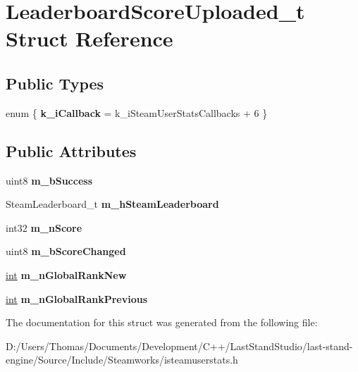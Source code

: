 \hypertarget{structLeaderboardScoreUploaded__t}{}\section{Leaderboard\+Score\+Uploaded\+\_\+t Struct Reference}
\label{structLeaderboardScoreUploaded__t}
\subsection*{Public Types}
\begin{DoxyCompactItemize}
\item 
\hypertarget{structLeaderboardScoreUploaded__t_ab6d171343b34b78e71011daea9d1ff19}{}enum \{ {\bfseries k\+\_\+i\+Callback} = k\+\_\+i\+Steam\+User\+Stats\+Callbacks + 6
 \}\label{structLeaderboardScoreUploaded__t_ab6d171343b34b78e71011daea9d1ff19}

\end{DoxyCompactItemize}
\subsection*{Public Attributes}
\begin{DoxyCompactItemize}
\item 
\hypertarget{structLeaderboardScoreUploaded__t_a3766dbe8dd8d8025675b33f0d6f7d97c}{}uint8 {\bfseries m\+\_\+b\+Success}\label{structLeaderboardScoreUploaded__t_a3766dbe8dd8d8025675b33f0d6f7d97c}

\item 
\hypertarget{structLeaderboardScoreUploaded__t_a4900e93dc306e7ccf68252759e64a976}{}Steam\+Leaderboard\+\_\+t {\bfseries m\+\_\+h\+Steam\+Leaderboard}\label{structLeaderboardScoreUploaded__t_a4900e93dc306e7ccf68252759e64a976}

\item 
\hypertarget{structLeaderboardScoreUploaded__t_a04da5bc31f53bb33c7efc6d97ec2dfbb}{}int32 {\bfseries m\+\_\+n\+Score}\label{structLeaderboardScoreUploaded__t_a04da5bc31f53bb33c7efc6d97ec2dfbb}

\item 
\hypertarget{structLeaderboardScoreUploaded__t_ac556d96384ddba95731ad75820004e86}{}uint8 {\bfseries m\+\_\+b\+Score\+Changed}\label{structLeaderboardScoreUploaded__t_ac556d96384ddba95731ad75820004e86}

\item 
\hypertarget{structLeaderboardScoreUploaded__t_a8008b7178416abd3d3ad7498d4f0f8a0}{}\hyperlink{SDL__thread_8h_a6a64f9be4433e4de6e2f2f548cf3c08e}{int} {\bfseries m\+\_\+n\+Global\+Rank\+New}\label{structLeaderboardScoreUploaded__t_a8008b7178416abd3d3ad7498d4f0f8a0}

\item 
\hypertarget{structLeaderboardScoreUploaded__t_a617a71e4f8a50d910a21db0a4612f5ad}{}\hyperlink{SDL__thread_8h_a6a64f9be4433e4de6e2f2f548cf3c08e}{int} {\bfseries m\+\_\+n\+Global\+Rank\+Previous}\label{structLeaderboardScoreUploaded__t_a617a71e4f8a50d910a21db0a4612f5ad}

\end{DoxyCompactItemize}


The documentation for this struct was generated from the following file\+:\begin{DoxyCompactItemize}
\item 
D\+:/\+Users/\+Thomas/\+Documents/\+Development/\+C++/\+Last\+Stand\+Studio/last-\/stand-\/engine/\+Source/\+Include/\+Steamworks/isteamuserstats.\+h\end{DoxyCompactItemize}
